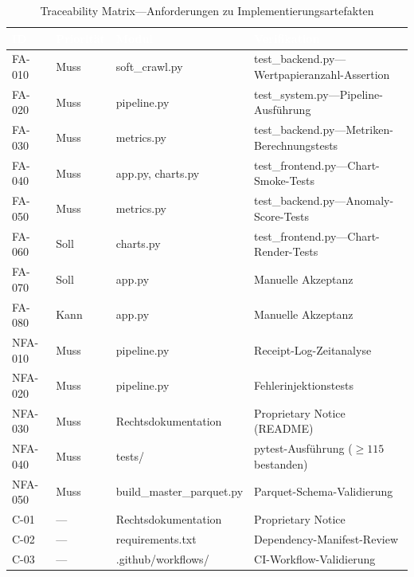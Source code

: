 \documentclass[11pt, a4paper, oneside, openany]{report}
\newcommand{\code}[1]{{\codefont\small\textcolor{DeepNavy}{#1}}}
\begin{document}
\begin{table}[H]
\centering
\caption{Traceability Matrix\;---\;Anforderungen zu Implementierungsartefakten}
\label{tab:traceability}
\sffamily\small
\begin{tabularx}{\textwidth}{l l l X}
  \toprule
  \rowcolor{DeepNavy} \textcolor{white}{\textbf{ID}} & \textcolor{white}{\textbf{Priorität}} & \textcolor{white}{\textbf{Modul}} & \textcolor{white}{\textbf{Verifikation}} \\
  \midrule
  FA-010  & Muss   & \code{soft\_crawl.py}             & \code{test\_backend.py}\;---\;Wertpapieranzahl-Assertion \\
  FA-020  & Muss   & \code{pipeline.py}                & \code{test\_system.py}\;---\;Pipeline-Ausführung \\
  FA-030  & Muss   & \code{metrics.py}                 & \code{test\_backend.py}\;---\;Metriken-Berechnungstests \\
  FA-040  & Muss   & \code{app.py}, \code{charts.py}   & \code{test\_frontend.py}\;---\;Chart-Smoke-Tests \\
  FA-050  & Muss   & \code{metrics.py}                 & \code{test\_backend.py}\;---\;Anomaly-Score-Tests \\
  FA-060  & Soll   & \code{charts.py}                  & \code{test\_frontend.py}\;---\;Chart-Render-Tests \\
  FA-070  & Soll   & \code{app.py}                     & Manuelle Akzeptanz \\
  FA-080  & Kann   & \code{app.py}                     & Manuelle Akzeptanz \\
  \midrule
  NFA-010 & Muss   & \code{pipeline.py}                & Receipt-Log-Zeitanalyse \\
  NFA-020 & Muss   & \code{pipeline.py}                & Fehlerinjektionstests \\
  NFA-030 & Muss   & Rechtsdokumentation               & Proprietary Notice (README) \\
  NFA-040 & Muss   & \code{tests/}                     & pytest-Ausführung ($\geq 115$ bestanden) \\
  NFA-050 & Muss   & \code{build\_master\_parquet.py}   & Parquet-Schema-Validierung \\
  \midrule
  C-01    & ---    & Rechtsdokumentation               & Proprietary Notice \\
  C-02    & ---    & \code{requirements.txt}           & Dependency-Manifest-Review \\
  C-03    & ---    & \code{.github/workflows/}         & CI-Workflow-Validierung \\
  \bottomrule
\end{tabularx}
\end{table}
\end{document}
